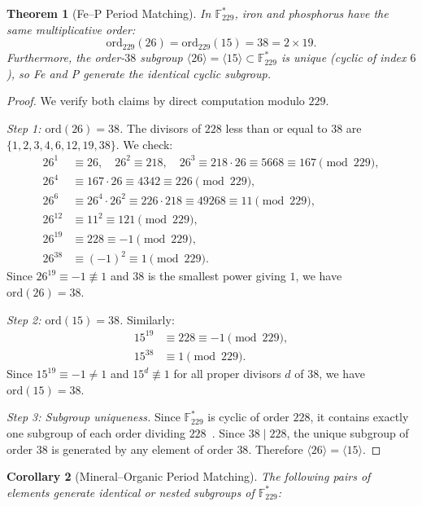 \documentclass[12pt]{article}
\theoremstyle{principia}
\newtheorem{theorem}{Theorem}[section]
\newtheorem{corollary}[theorem]{Corollary}
\theoremstyle{definition}
\theoremstyle{remark}
\providecommand{\FF}{\mathbb{F}}
\begin{document}
\begin{theorem}[Fe--P Period Matching]\label{thm:fe_p}
In $\FF_{229}^*$, iron and phosphorus have the same multiplicative order:
\[
\mathrm{ord}_{229}(26) = \mathrm{ord}_{229}(15) = 38 = 2 \times 19.
\]
Furthermore, the order-$38$ subgroup $\langle 26 \rangle = \langle 15 \rangle \subset \FF_{229}^*$ is unique (cyclic of index $6$), so Fe and P generate the \emph{identical} cyclic subgroup.
\end{theorem}

\begin{proof}
We verify both claims by direct computation modulo $229$.

\emph{Step 1: $\mathrm{ord}(26) = 38$.} The divisors of $228$ less than or equal to $38$ are $\{1, 2, 3, 4, 6, 12, 19, 38\}$. We check:
\begin{align*}
26^1 &\equiv 26, \quad 26^2 \equiv 218, \quad 26^3 \equiv 218 \cdot 26 \equiv 5668 \equiv 167 \pmod{229}, \\
26^4 &\equiv 167 \cdot 26 \equiv 4342 \equiv 226 \pmod{229}, \\
26^6 &\equiv 26^4 \cdot 26^2 \equiv 226 \cdot 218 \equiv 49268 \equiv 11 \pmod{229}, \\
26^{12} &\equiv 11^2 \equiv 121 \pmod{229}, \\
26^{19} &\equiv 228 \equiv -1 \pmod{229}, \\
26^{38} &\equiv (-1)^2 \equiv 1 \pmod{229}.
\end{align*}
Since $26^{19} \equiv -1 \not\equiv 1$ and $38$ is the smallest power giving $1$, we have $\mathrm{ord}(26) = 38$.

\emph{Step 2: $\mathrm{ord}(15) = 38$.} Similarly:
\begin{align*}
15^{19} &\equiv 228 \equiv -1 \pmod{229}, \\
15^{38} &\equiv 1 \pmod{229}.
\end{align*}
Since $15^{19} \equiv -1 \neq 1$ and $15^d \not\equiv 1$ for all proper divisors $d$ of $38$, we have $\mathrm{ord}(15) = 38$.

\emph{Step 3: Subgroup uniqueness.} Since $\FF_{229}^*$ is cyclic of order $228$, it contains exactly one subgroup of each order dividing $228$~\cite{Artin_Algebra}. Since $38 \mid 228$, the unique subgroup of order $38$ is generated by any element of order $38$. Therefore $\langle 26 \rangle = \langle 15 \rangle$.
\end{proof}

\begin{corollary}[Mineral--Organic Period Matching]\label{cor:matching}
The following pairs of elements generate identical or nested subgroups of $\FF_{229}^*$:
\end{corollary}
\end{document}
